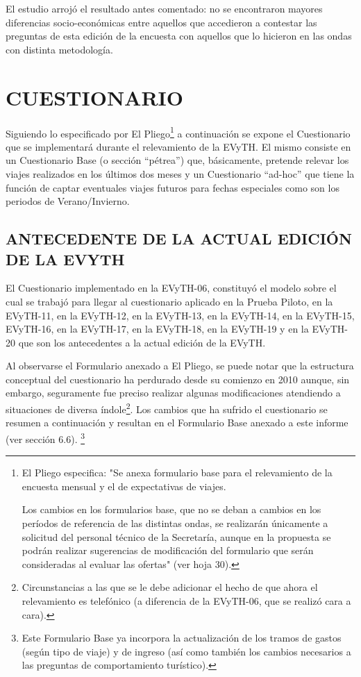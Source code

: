 \documentclass[
  openany]{book}
\begin{document}
El estudio arrojó el resultado antes comentado: no se encontraron mayores diferencias socio-económicas entre aquellos que accedieron a contestar las preguntas de esta edición de la encuesta con aquellos que lo hicieron en las ondas con distinta metodología.

\hypertarget{cuestionario}{%
\section{\texorpdfstring{\textbf{CUESTIONARIO}}{CUESTIONARIO}}\label{cuestionario}}

Siguiendo lo especificado por El Pliego\footnote{El Pliego especifica: "Se anexa formulario base para el relevamiento de la encuesta mensual y el de expectativas de viajes.

  Los cambios en los formularios base, que no se deban a cambios en los períodos de referencia de las distintas ondas, se realizarán únicamente a solicitud del personal técnico de la Secretaría, aunque en la propuesta se podrán realizar sugerencias de modificación del formulario que serán consideradas al evaluar las ofertas" (ver hoja 30).} a continuación se expone el Cuestionario que se implementará durante el relevamiento de la EVyTH.
El mismo consiste en un Cuestionario Base (o sección ``pétrea'') que, básicamente, pretende relevar los viajes realizados en los últimos dos meses y un Cuestionario ``ad-hoc'' que tiene la función de captar eventuales viajes futuros para fechas especiales como son los periodos de Verano/Invierno.

\hypertarget{antecedente-de-la-actual-edicion-de-la-evyth}{%
\subsection{\texorpdfstring{\textbf{ANTECEDENTE DE LA ACTUAL EDICIÓN DE LA EVYTH}}{ANTECEDENTE DE LA ACTUAL EDICIÓN DE LA EVYTH}}\label{antecedente-de-la-actual-edicion-de-la-evyth}}

El Cuestionario implementado en la EVyTH-06, constituyó el modelo sobre el cual se trabajó para llegar al cuestionario aplicado en la Prueba Piloto, en la EVyTH-11, en la EVyTH-12, en la EVyTH-13, en la EVyTH-14, en la EVyTH-15, EVyTH-16, en la EVyTH-17, en la EVyTH-18, en la EVyTH-19 y en la EVyTH-20 que son los antecedentes a la actual edición de la EVyTH.

Al observarse el Formulario anexado a El Pliego, se puede notar que la estructura conceptual del cuestionario ha perdurado desde su comienzo en 2010 aunque, sin embargo, seguramente fue preciso realizar algunas modificaciones atendiendo a situaciones de diversa índole\footnote{Circunstancias a las que se le debe adicionar el hecho de que ahora el relevamiento es telefónico (a diferencia de la EVyTH-06, que se realizó cara a cara).}.
Los cambios que ha sufrido el cuestionario se resumen a continuación y resultan en el Formulario Base anexado a este informe (ver sección 6.6).
\footnote{Este Formulario Base ya incorpora la actualización de los tramos de gastos (según tipo de viaje) y de ingreso (así como también los cambios necesarios a las preguntas de comportamiento turístico).}
\end{document}
